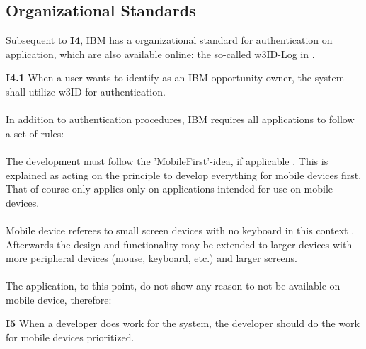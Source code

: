 \subsection{Organizational Standards}
Subsequent to \textbf{I4}, IBM has a organizational standard for authentication on application, which are also available online: the so-called w3ID-Log in \parencite[cf.][]{IBMCorporation.2016}.

\begin{closeItem}
    \item [\textbf{I4.1}] When a user wants to identify as an IBM opportunity owner, the system shall utilize w3ID for authentication.
\end{closeItem}

\paragraph{} In addition to authentication procedures, IBM requires all applications to follow a set of rules:

\paragraph{} The development must follow the 'MobileFirst'-idea, if applicable \parencite[cf.][]{IBMCorporation.2016}. This is explained as acting on the principle to develop everything for mobile devices first. That of course only applies only on applications intended for use on mobile devices.

\paragraph{} Mobile device referees to small screen devices with no keyboard in this context \parencite[cf.][]{Duong.2014}. Afterwards the design and functionality may be extended to larger devices with more peripheral devices (mouse, keyboard, etc.) and larger screens.

\paragraph{} The application, to this point, do not show any reason to not be available on mobile device, therefore:

\begin{closeItem}
    \item [\textbf{I5}] When a developer does work for the system, the developer should do the work for mobile devices prioritized.
\end{closeItem}

